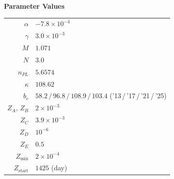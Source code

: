 \documentclass[11pt,a4paper]{article}
\begin{document}
\smallskip
\noindent\begin{minipage}{\linewidth}
\noindent\textbf{Parameter Values}

\smallskip\noindent
\begin{tabular}{@{}r@{$\;=\;$}l@{}}
  {\color{accent}$\alpha$}           & {\color{accent}$-7.8\times10^{-4}$} \\[2pt]
  {\color{accent}$\gamma$}           & {\color{accent}$3.0\times10^{-3}$}  \\[2pt]
  {\color{accent}$M$}                & {\color{accent}$1.071$}             \\[2pt]
  {\color{accent}$N$}                & {\color{accent}$3.0$}               \\[5pt]
  {\color{cdiff}$n_{PL}$}            & {\color{cdiff}$5.6574$}             \\[2pt]
  {\color{cdiff}$\kappa$}            & {\color{cdiff}$108.62$}             \\[2pt]
  {\color{cdiff}$b_c$}               & {\color{cdiff}$58.2\,/\,96.8\,/\,108.9\,/\,103.4$ ('13\,/\,'17\,/\,'21\,/\,'25)} \\[5pt]
  {\color{cwang}$Z_A,\,Z_B$}        & {\color{cwang}$2\times10^{-3}$}     \\[2pt]
  {\color{cwang}$Z_C$}               & {\color{cwang}$3.9\times10^{-3}$}  \\[2pt]
  {\color{cwang}$Z_D$}               & {\color{cwang}$10^{-6}$}            \\[2pt]
  {\color{cwang}$Z_E$}               & {\color{cwang}$0.5$}                \\[2pt]
  {\color{cwang}$Z_{\mathrm{mix}}$}  & {\color{cwang}$2\times10^{-4}$}     \\[2pt]
  {\color{cwang}$Z_{\mathrm{start}}$}& {\color{cwang}$1425$ (day)}
\end{tabular}
\end{minipage}
\end{document}

